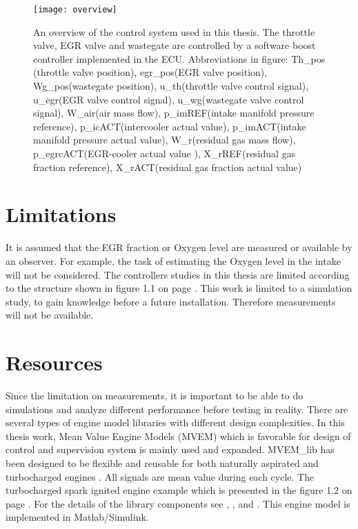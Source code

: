\begin{figure}
\texttt{[image: overview]} 
\label{fig:overview}
\caption{An overview of the control system used in this thesis. The throttle valve, EGR valve and wastegate are controlled by a software boost controller implemented in the ECU. Abbreviations in figure: Th\_pos  (throttle valve position), egr\_pos(EGR valve position), Wg\_pos(wastegate position), u\_th(throttle valve control signal), u\_egr(EGR valve control signal), u\_wg(wastegate valve control signal), W\_air(air mass flow), p\_imREF(intake manifold pressure reference), p\_icACT(intercooler actual value), p\_imACT(intake manifold pressure actual value), W\_r(residual gas mass flow), p\_egrcACT(EGR-cooler actual value ), X\_rREF(residual gas fraction reference), X\_rACT(residual gas fraction actual value)}
\end{figure}
 
\section{Limitations}
It is assumed that the EGR fraction or Oxygen level are measured or available by an observer. For example, the task of estimating the Oxygen level in the intake will not be considered. The controllers studies in this thesis are limited according to the structure shown in figure 1.1 on page \pageref{fig:overview}. This work is limited to a simulation study, to gain knowledge before a future installation. Therefore measurements will not be available.

\section{Resources}
Since the limitation on measurements, it is important to be able to do simulations and analyze different performance before testing in reality. There are several types of engine model libraries with different design complexities. In this thesis work, Mean Value Engine Models (MVEM) which is favorable for design of control and supervision system is mainly used and expanded. MVEM\_lib has been designed to be flexible and reusable for both naturally aspirated and turbocharged engines \citep{eriksson2008modeling}. All signals are mean value during each cycle. The turbocharged spark ignited engine example which is presented in the figure 1.2 on page \pageref{fig:TCSI_overview}. For the details of the library components see \citep{Per:2005}, \citep{eriksson2002modeling}, \citep{eriksson2007modeling} and \citep{eriksson2014modeling}. This engine model is implemented in Matlab/Simulink.

